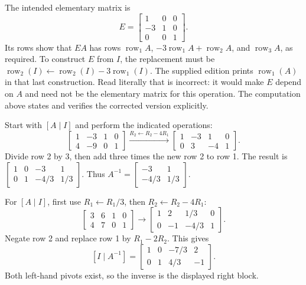 The intended elementary matrix is
\[
 E=\begin{bmatrix}1&0&0\\-3&1&0\\0&0&1\end{bmatrix}.
\]
Its rows show that $EA$ has rows
$\operatorname{row}_1A$, $-3\operatorname{row}_1A+\operatorname{row}_2A$,
and $\operatorname{row}_3A$, as required.
To construct $E$ from $I$, the replacement must be
$\operatorname{row}_2(I)\gets\operatorname{row}_2(I)-3\operatorname{row}_1(I)$.
The supplied edition prints $\operatorname{row}_1(A)$ in that last
construction. Read literally that is incorrect: it would make $E$
depend on $A$ and need not be the elementary matrix for this operation.
The computation above states and verifies the corrected version explicitly.

Start with $[A\mid I]$ and perform the indicated operations:
\[
 \left[\begin{array}{rr|rr}1&-3&1&0\\4&-9&0&1\end{array}\right]
 \xrightarrow{R_2\gets R_2-4R_1}
 \left[\begin{array}{rr|rr}1&-3&1&0\\0&3&-4&1\end{array}\right].
\]
Divide row 2 by $3$, then add three times the new row 2 to row 1.
The result is
$\left[\begin{array}{rr|rr}1&0&-3&1\\0&1&-4/3&1/3\end{array}\right]$.
Thus $A^{-1}=\begin{bmatrix}-3&1\\-4/3&1/3\end{bmatrix}$.

For $[A\mid I]$, first use $R_1\gets R_1/3$, then
$R_2\gets R_2-4R_1$:
\[
 \left[\begin{array}{rr|rr}3&6&1&0\\4&7&0&1\end{array}\right]
 \longrightarrow
 \left[\begin{array}{rr|rr}1&2&1/3&0\\0&-1&-4/3&1\end{array}\right].
\]
Negate row 2 and replace row 1 by $R_1-2R_2$. This gives
\[
 [I\mid A^{-1}]=
 \left[\begin{array}{rr|rr}1&0&-7/3&2\\0&1&4/3&-1\end{array}\right].
\]
Both left-hand pivots exist, so the inverse is the displayed right block.

